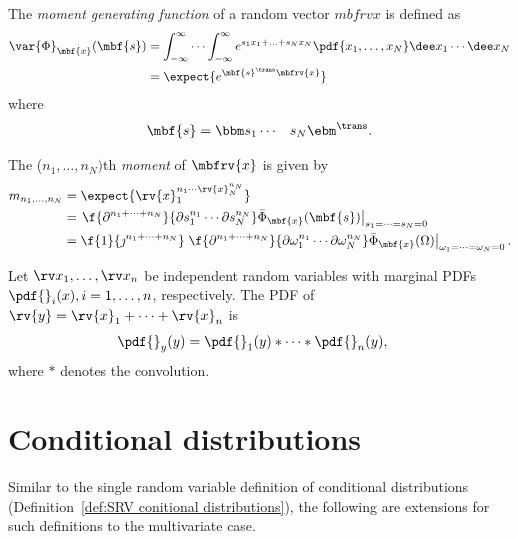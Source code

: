 \begin{mydefinition}
    The \emph{moment generating function} of a random vector $mbfrv{x}$ is defined as
    \begin{align}
        \var{\Phi}_{\mbf{x}}(\mbf{s}) &= \int_{-\infty}^{\infty}\cdots\int_{-\infty}^{\infty} e^{s_{1}x_{1}+\ldots+s_{N}x_{N}}\pdf{x_{1},\ldots,x_{N}}\dee x_{1}\cdots\dee x_{N}\\
        &= \expect{e^{\mbf{s}^{\trans}\mbfrv{x}}}
    \end{align}
    where
    \begin{align}
        \mbf{s} = \bbm s_{1} & \cdots & s_{N} \ebm^{\trans}.
    \end{align}
\end{mydefinition}



\begin{mytheorem}
       The ($n_{1},\ldots,n_{N})$th \emph{moment} of $\mbfrv{x}$ is given by
       \begin{align}
           m_{n_{1},\ldots,n_{N}} 
           &= \expect{\rv{x}_{1}^{n_{1}\cdots\rv{x}_{N}^{n_{N}}}}\\
           &= \left.\f{\partial^{n_{1}+\cdots+n_{N}}}{\partial s_{1}^{n_{1}}\cdots\partial s_{N}^{n_{N}}}\bar{\Phi}_{\mbf{x}}(\mbf{s})\right|_{s_{1}=\cdots=s_{N}=0}\\
           &=\f{1}{\jmath^{n_{1}+\cdots+n_{N}}} \left.\f{\partial^{n_{1}+\cdots+n_{N}}}{\partial \omega_{1}^{n_{1}}\cdots\partial \omega_{N}^{n_{N}}}\bar{\Phi}_{\mbf{x}}(\Omega)\right|_{\omega_{1}=\cdots=\omega_{N}=0}.
       \end{align}
\end{mytheorem}


\begin{mytheorem}
       Let $\stringRVs{x}{n}$ be independent random variables with marginal PDFs $\pdf{}_{i}(x), i=1,\ldots,n$, respectively. The PDF of $\rv{y}=\rv{x}_{1} + \cdots + \rv{x}_{n}$ is
       \begin{align}
           \pdf{}_{y}(y) &= \pdf{}_{1}(y)\ast\cdots\ast\pdf{}_{n}(y),
       \end{align}
       where $\ast$ denotes the convolution.
\end{mytheorem}



\section{Conditional distributions}
Similar to the single random variable definition of conditional distributions (Definition~\ref{def:SRV conitional distributions}), the following are extensions for such definitions to the multivariate case.


